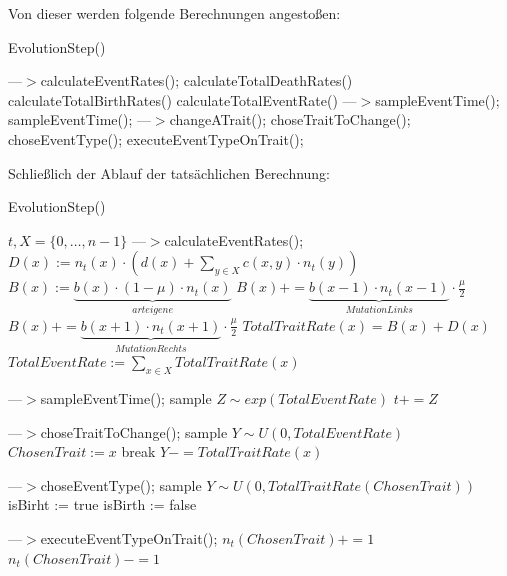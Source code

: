 \documentclass[11pt, a4paper, german]{article}
\begin{document}
	Von dieser werden folgende Berechnungen angestoßen:
		
	\begin{algorithm}[H]
		\caption{EvolutionStep()}
		\begin{algorithmic}[1]
			\STATE ---$>$calculateEventRates();
			\STATE calculateTotalDeathRates()
			\STATE calculateTotalBirthRates()
			\STATE calculateTotalEventRate()
			\STATE ---$>$sampleEventTime();
			\STATE sampleEventTime();
			\STATE ---$>$changeATrait();
			\STATE choseTraitToChange();
			\STATE choseEventType();
			\STATE executeEventTypeOnTrait();
		\end{algorithmic}
	\end{algorithm}
	
	Schließlich der Ablauf der tatsächlichen Berechnung:
	
	\begin{algorithm}[H]
		\caption{EvolutionStep()}
		\begin{algorithmic}[1]
			\REQUIRE $ t, X = \{0,\dots, n-1\} $
			\STATE ---$>$calculateEventRates();
				\STATE $  D(x) := n_t(x) \cdot \left( d(x) + \sum_{y \in X} c(x,y) \cdot n_t(y) \right) $
				\STATE $ B(x) := \underbrace{b(x) \cdot (1 - \mu) \cdot n_t(x)}_{arteigene}  $
					\STATE $ B(x) += \underbrace{b(x-1)\cdot n_t(x-1)}_{Mutation Links} \cdot \frac{\mu}{2} $
				\ENDIF
					\STATE $ B(x) += \underbrace{b(x+1)\cdot n_t(x+1)}_{Mutation Rechts} \cdot \frac{\mu}{2} $
				\ENDIF
				\STATE $ TotalTraitRate(x) = B(x) + D(x) $
			\ENDFOR
			\STATE $ TotalEventRate := \sum_{x \in X} TotalTraitRate(x) $
			
			\STATE ---$>$sampleEventTime();
			\STATE sample $ Z \sim exp(TotalEventRate) $
			\STATE $ t += Z $
			
			\STATE ---$>$choseTraitToChange();
			\STATE sample $ Y \sim U(0,TotalEventRate) $
					\STATE $ ChosenTrait := x $
					\STATE break
				\ENDIF
				\STATE $ Y -= TotalTraitRate(x) $
			\ENDFOR
			
			\STATE ---$>$choseEventType();
			\STATE sample $ Y \sim U(0,TotalTraitRate(ChosenTrait)) $
				\STATE isBirht := true
			\ELSE
				\STATE isBirth := false
			\ENDIF
			
			\STATE ---$>$executeEventTypeOnTrait();
				\STATE $ n_t(ChosenTrait) += 1 $
			\ELSE
					\STATE $ n_t(ChosenTrait) -= 1 $
				\ENDIF
			\ENDIF
		\end{algorithmic}
	\end{algorithm}
	
\end{document}
